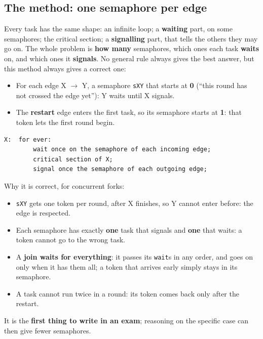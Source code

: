 \subsection{The method: one semaphore per edge}
Every task has the same shape: an infinite loop; a \textbf{waiting} part, on some semaphores; the critical section; a \textbf{signalling} part, that tells the others they may go on. The whole problem is \textbf{how many} semaphores, which ones each task \textbf{waits} on, and which ones it \textbf{signals}. No general rule always gives the best answer, but this method always gives a correct one:
\begin{itemize}
    \item For each edge X $\rightarrow$ Y, a semaphore \texttt{sXY} that starts at \textbf{0} (``this round has not crossed the edge yet''): Y waits until X signals.
    \item The \textbf{restart} edge enters the first task, so its semaphore starts at \textbf{1}: that token lets the first round begin.
\end{itemize}
\begin{lstlisting}[basicstyle=\ttfamily\footnotesize]
X:  for ever:
        wait once on the semaphore of each incoming edge;
        critical section of X;
        signal once the semaphore of each outgoing edge;
\end{lstlisting}
Why it is correct, for concurrent forks:
\begin{itemize}
    \item \texttt{sXY} gets one token per round, after X finishes, so Y cannot enter before: the edge is respected.
    \item Each semaphore has exactly \textbf{one} task that signals and \textbf{one} that waits: a token cannot go to the wrong task.
    \item A \textbf{join waits for everything}: it passes its \texttt{wait}s in any order, and goes on only when it has them all; a token that arrives early simply stays in its semaphore.
    \item A task cannot run twice in a round: its token comes back only after the restart.
\end{itemize}
It is the \textbf{first thing to write in an exam}; reasoning on the specific case can then give fewer semaphores.

